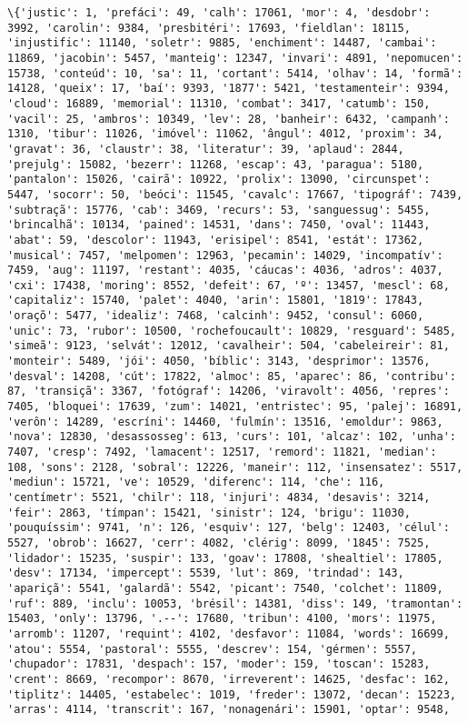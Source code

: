 \documentclass[11pt]{article}
\begin{document}
    \begin{Verbatim}[commandchars=\\\{\}]
\{'justic': 1, 'prefáci': 49, 'calh': 17061, 'mor': 4, 'desdobr': 3992, 'carolin': 9384, 'presbitéri': 17693, 'fieldlan': 18115, 'injustific': 11140, 'soletr': 9885, 'enchiment': 14487, 'cambai': 11869, 'jacobin': 5457, 'manteig': 12347, 'invari': 4891, 'nepomucen': 15738, 'conteúd': 10, 'sa': 11, 'cortant': 5414, 'olhav': 14, 'formã': 14128, 'queix': 17, 'baí': 9393, '1877': 5421, 'testamenteir': 9394, 'cloud': 16889, 'memorial': 11310, 'combat': 3417, 'catumb': 150, 'vacil': 25, 'ambros': 10349, 'lev': 28, 'banheir': 6432, 'campanh': 1310, 'tibur': 11026, 'imóvel': 11062, 'ângul': 4012, 'proxim': 34, 'gravat': 36, 'claustr': 38, 'literatur': 39, 'aplaud': 2844, 'prejulg': 15082, 'bezerr': 11268, 'escap': 43, 'paragua': 5180, 'pantalon': 15026, 'cairã': 10922, 'prolix': 13090, 'circunspet': 5447, 'socorr': 50, 'beóci': 11545, 'cavalc': 17667, 'tipográf': 7439, 'subtraçã': 15776, 'cab': 3469, 'recurs': 53, 'sanguessug': 5455, 'brincalhã': 10134, 'pained': 14531, 'dans': 7450, 'oval': 11443, 'abat': 59, 'descolor': 11943, 'erisipel': 8541, 'estát': 17362, 'musical': 7457, 'melpomen': 12963, 'pecamin': 14029, 'incompatív': 7459, 'aug': 11197, 'restant': 4035, 'cáucas': 4036, 'adros': 4037, 'cxi': 17438, 'moring': 8552, 'defeit': 67, 'º': 13457, 'mescl': 68, 'capitaliz': 15740, 'palet': 4040, 'arin': 15801, '1819': 17843, 'oraçõ': 5477, 'idealiz': 7468, 'calcinh': 9452, 'consul': 6060, 'unic': 73, 'rubor': 10500, 'rochefoucault': 10829, 'resguard': 5485, 'simeã': 9123, 'selvát': 12012, 'cavalheir': 504, 'cabeleireir': 81, 'monteir': 5489, 'jói': 4050, 'bíblic': 3143, 'desprimor': 13576, 'desval': 14208, 'cút': 17822, 'almoc': 85, 'aparec': 86, 'contribu': 87, 'transiçã': 3367, 'fotógraf': 14206, 'viravolt': 4056, 'repres': 7405, 'bloquei': 17639, 'zum': 14021, 'entristec': 95, 'palej': 16891, 'verôn': 14289, 'escríni': 14460, 'fulmín': 13516, 'emoldur': 9863, 'nova': 12830, 'desassosseg': 613, 'curs': 101, 'alcaz': 102, 'unha': 7407, 'cresp': 7492, 'lamacent': 12517, 'remord': 11821, 'median': 108, 'sons': 2128, 'sobral': 12226, 'maneir': 112, 'insensatez': 5517, 'mediun': 15721, 've': 10529, 'diferenc': 114, 'che': 116, 'centímetr': 5521, 'chilr': 118, 'injuri': 4834, 'desavis': 3214, 'feir': 2863, 'tímpan': 15421, 'sinistr': 124, 'brigu': 11030, 'pouquíssim': 9741, 'n': 126, 'esquiv': 127, 'belg': 12403, 'célul': 5527, 'obrob': 16627, 'cerr': 4082, 'clérig': 8099, '1845': 7525, 'lidador': 15235, 'suspir': 133, 'goav': 17808, 'shealtiel': 17805, 'desv': 17134, 'impercept': 5539, 'lut': 869, 'trindad': 143, 'apariçã': 5541, 'galardã': 5542, 'picant': 7540, 'colchet': 11809, 'ruf': 889, 'inclu': 10053, 'brésil': 14381, 'diss': 149, 'tramontan': 15403, 'only': 13796, '.--': 17680, 'tribun': 4100, 'mors': 11975, 'arromb': 11207, 'requint': 4102, 'desfavor': 11084, 'words': 16699, 'atou': 5554, 'pastoral': 5555, 'descrev': 154, 'gérmen': 5557, 'chupador': 17831, 'despach': 157, 'moder': 159, 'toscan': 15283, 'crent': 8669, 'recompor': 8670, 'irreverent': 14625, 'desfac': 162, 'tiplitz': 14405, 'estabelec': 1019, 'freder': 13072, 'decan': 15223, 'arras': 4114, 'transcrit': 167, 'nonagenári': 15901, 'optar': 9548, 
\end{Verbatim}
\end{document}
